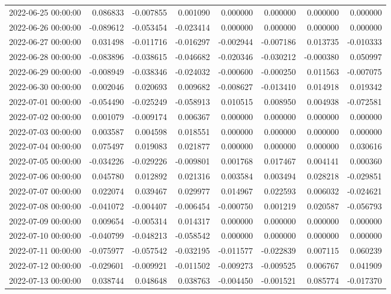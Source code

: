 \begin{tabular}{lrrrrrrr}
2022-06-25 00:00:00 & 0.086833 & -0.007855 & 0.001090 & 0.000000 & 0.000000 & 0.000000 & 0.000000 \\
2022-06-26 00:00:00 & -0.089612 & -0.053454 & -0.023414 & 0.000000 & 0.000000 & 0.000000 & 0.000000 \\
2022-06-27 00:00:00 & 0.031498 & -0.011716 & -0.016297 & -0.002944 & -0.007186 & 0.013735 & -0.010333 \\
2022-06-28 00:00:00 & -0.083896 & -0.038615 & -0.046682 & -0.020346 & -0.030212 & -0.000380 & 0.050997 \\
2022-06-29 00:00:00 & -0.008949 & -0.038346 & -0.024032 & -0.000600 & -0.000250 & 0.011563 & -0.007075 \\
2022-06-30 00:00:00 & 0.002046 & 0.020693 & 0.009682 & -0.008627 & -0.013410 & 0.014918 & 0.019342 \\
2022-07-01 00:00:00 & -0.054490 & -0.025249 & -0.058913 & 0.010515 & 0.008950 & 0.004938 & -0.072581 \\
2022-07-02 00:00:00 & 0.001079 & -0.009174 & 0.006367 & 0.000000 & 0.000000 & 0.000000 & 0.000000 \\
2022-07-03 00:00:00 & 0.003587 & 0.004598 & 0.018551 & 0.000000 & 0.000000 & 0.000000 & 0.000000 \\
2022-07-04 00:00:00 & 0.075497 & 0.019083 & 0.021877 & 0.000000 & 0.000000 & 0.000000 & 0.030616 \\
2022-07-05 00:00:00 & -0.034226 & -0.029226 & -0.009801 & 0.001768 & 0.017467 & 0.004141 & 0.000360 \\
2022-07-06 00:00:00 & 0.045780 & 0.012892 & 0.021316 & 0.003584 & 0.003494 & 0.028218 & -0.029851 \\
2022-07-07 00:00:00 & 0.022074 & 0.039467 & 0.029977 & 0.014967 & 0.022593 & 0.006032 & -0.024621 \\
2022-07-08 00:00:00 & -0.041072 & -0.004407 & -0.006454 & -0.000750 & 0.001219 & 0.020587 & -0.056793 \\
2022-07-09 00:00:00 & 0.009654 & -0.005314 & 0.014317 & 0.000000 & 0.000000 & 0.000000 & 0.000000 \\
2022-07-10 00:00:00 & -0.040799 & -0.048213 & -0.058542 & 0.000000 & 0.000000 & 0.000000 & 0.000000 \\
2022-07-11 00:00:00 & -0.075977 & -0.057542 & -0.032195 & -0.011577 & -0.022839 & 0.007115 & 0.060239 \\
2022-07-12 00:00:00 & -0.029601 & -0.009921 & -0.011502 & -0.009273 & -0.009525 & 0.006767 & 0.041909 \\
2022-07-13 00:00:00 & 0.038744 & 0.048648 & 0.038763 & -0.004450 & -0.001521 & 0.085774 & -0.017370 \\

\end{tabular}
